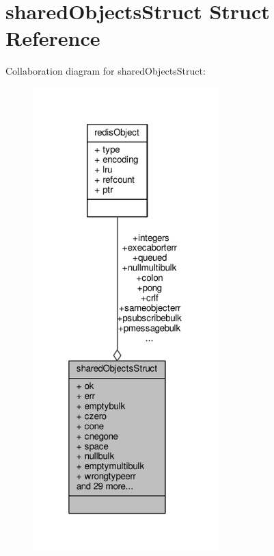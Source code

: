 \hypertarget{structsharedObjectsStruct}{}\section{shared\+Objects\+Struct Struct Reference}
\label{structsharedObjectsStruct}


Collaboration diagram for shared\+Objects\+Struct\+:\nopagebreak
\begin{figure}[H]
\begin{center}
\leavevmode
\includegraphics[width=205pt]{structsharedObjectsStruct__coll__graph}
\end{center}
\end{figure}
